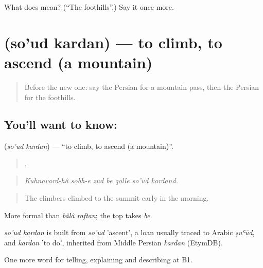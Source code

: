 \begin{tcolorbox}[breakable,colback=teal!4,colframe=teal!35!black,title={Before you move on}]
What does  mean? (\textquotedblleft{}The foothills\textquotedblright{}.) Say it once more.
\end{tcolorbox}
\section[\texorpdfstring{\fa{صعود} \fa{کردن} (so'ud kardan)}{صعود کردن (so'ud kardan)}]{  (so'ud kardan) — to climb, to ascend (a mountain)}

\label{lesson:FA-C468-soud-kardan}



\begin{quote}
Before the new one: say the Persian for a mountain pass, then the Persian for the foothills.
\end{quote}

\subsection*{You'll want to know:  }
\textbf{ } (\emph{so'ud kardan}) — \textquotedblleft{}to climb, to ascend (a mountain)\textquotedblright{}.

\begin{quote}
      .
\end{quote}

\begin{quote}
\emph{Kuhnavard-hâ sobh-e zud be qolle so'ud kardand.}
\end{quote}

\begin{quote}
The climbers climbed to the summit early in the morning.
\end{quote}

More formal than \emph{bâlâ raftan}; the top takes \emph{be}.

\begin{cousinweb}
\emph{so'ud kardan} is built from \emph{so'ud} 'ascent', a loan usually traced to Arabic \emph{ṣuʿūd}, and \emph{kardan} 'to do', inherited from Middle Persian \emph{kardan} (EtymDB).
\end{cousinweb}

\begin{grammarlens}[title={What you've built}]
One more word for telling, explaining and describing at B1.
\end{grammarlens}

